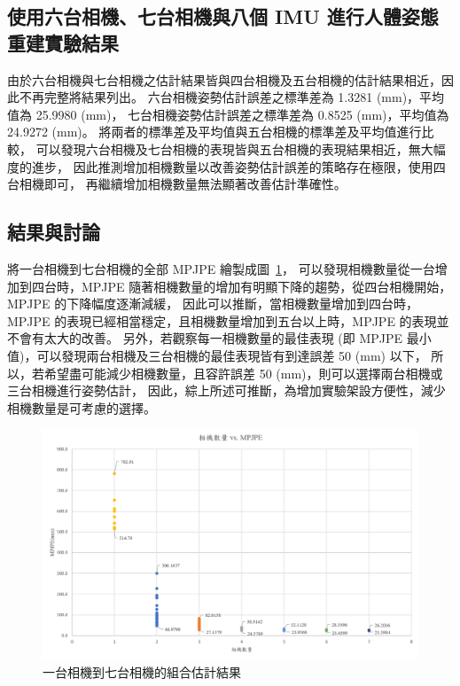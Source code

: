 \subsection{使用六台相機、七台相機與八個 IMU 進行人體姿態重建實驗結果}
由於六台相機與七台相機之估計結果皆與四台相機及五台相機的估計結果相近，因此不再完整將結果列出。
六台相機姿勢估計誤差之標準差為 1.3281 (mm)，平均值為 25.9980 (mm)，
七台相機姿勢估計誤差之標準差為 0.8525 (mm)，平均值為 24.9272 (mm)。
將兩者的標準差及平均值與五台相機的標準差及平均值進行比較，
可以發現六台相機及七台相機的表現皆與五台相機的表現結果相近，無大幅度的進步，
因此推測增加相機數量以改善姿勢估計誤差的策略存在極限，使用四台相機即可，
再繼續增加相機數量無法顯著改善估計準確性。

\subsection{結果與討論}
將一台相機到七台相機的全部 MPJPE 繪製成圖~\ref{ch3_fig_1to7cam}，
可以發現相機數量從一台增加到四台時，MPJPE 隨著相機數量的增加有明顯下降的趨勢，從四台相機開始，MPJPE 的下降幅度逐漸減緩，
因此可以推斷，當相機數量增加到四台時，MPJPE 的表現已經相當穩定，且相機數量增加到五台以上時，MPJPE 的表現並不會有太大的改善。
另外，若觀察每一相機數量的最佳表現 (即 MPJPE 最小值)，可以發現兩台相機及三台相機的最佳表現皆有到達誤差 50 (mm) 以下，
所以，若希望盡可能減少相機數量，且容許誤差 50 (mm)，則可以選擇兩台相機或三台相機進行姿勢估計，
因此，綜上所述可推斷，為增加實驗架設方便性，減少相機數量是可考慮的選擇。
\begin{figure}[!ht]
   \centering
   \includegraphics[width=\linewidth]{figure/ch3_fig_1to7cam.png}
   \caption[一台相機到七台相機的組合估計結果]{一台相機到七台相機的組合估計結果}
   \label{ch3_fig_1to7cam}
\end{figure}

